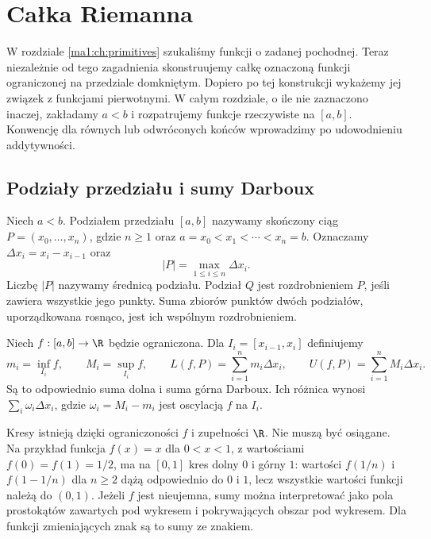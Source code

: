 \chapter{Całka Riemanna}
\providecommand{\atlasref}[2]{#2}
\label{ma1:ch:riemann-integral}

W rozdziale \ref{ma1:ch:primitives} szukaliśmy funkcji o zadanej pochodnej. Teraz niezależnie od tego zagadnienia skonstruujemy całkę oznaczoną funkcji ograniczonej na przedziale domkniętym. Dopiero po tej konstrukcji wykażemy jej związek z funkcjami pierwotnymi. W całym rozdziale, o ile nie zaznaczono inaczej, zakładamy $a<b$ i rozpatrujemy funkcje rzeczywiste na $[a,b]$. Konwencję dla równych lub odwróconych końców wprowadzimy po udowodnieniu addytywności.

\section{Podziały przedziału i sumy Darboux}
\begin{definicja}
\label{ma1:def:riemann-partition}
Niech $a<b$. Podziałem przedziału $[a,b]$ nazywamy skończony ciąg $P=(x_0,\ldots,x_n)$, gdzie $n\ge1$ oraz $a=x_0<x_1<\cdots<x_n=b$. Oznaczamy $\Delta x_i=x_i-x_{i-1}$ oraz
\[
 |P|=\max_{1\le i\le n}\Delta x_i.
\]
Liczbę $|P|$ nazywamy średnicą podziału. Podział $Q$ jest rozdrobnieniem $P$, jeśli zawiera wszystkie jego punkty. Suma zbiorów punktów dwóch podziałów, uporządkowana rosnąco, jest ich wspólnym rozdrobnieniem.
\end{definicja}
\begin{definicja}
\label{ma1:def:darboux-sums}
Niech $f:[a,b]\to\R$ będzie ograniczona. Dla $I_i=[x_{i-1},x_i]$ definiujemy
\[
 m_i=\inf_{I_i}f,\qquad M_i=\sup_{I_i}f,\qquad
 L(f,P)=\sum_{i=1}^n m_i\Delta x_i,\qquad
 U(f,P)=\sum_{i=1}^n M_i\Delta x_i.
\]
Są to odpowiednio suma dolna i suma górna Darboux. Ich różnica wynosi $\sum_i\omega_i\Delta x_i$, gdzie $\omega_i=M_i-m_i$ jest oscylacją $f$ na $I_i$.
\end{definicja}
Kresy istnieją dzięki ograniczoności $f$ i zupełności $\R$. Nie muszą być osiągane. Na przykład funkcja $f(x)=x$ dla $0<x<1$, z wartościami $f(0)=f(1)=1/2$, ma na $[0,1]$ kres dolny $0$ i górny $1$: wartości $f(1/n)$ i $f(1-1/n)$ dla $n\ge2$ dążą odpowiednio do $0$ i $1$, lecz wszystkie wartości funkcji należą do $(0,1)$. Jeżeli $f$ jest nieujemna, sumy można interpretować jako pola prostokątów zawartych pod wykresem i pokrywających obszar pod wykresem. Dla funkcji zmieniających znak są to sumy ze znakiem.

